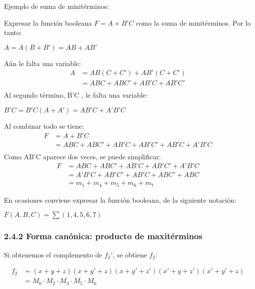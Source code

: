 \documentclass{article}
\begin{document}
Ejemplo de suma de minit\'{e}rminos:
\begin{flushleft}
    Expresar la funci\'{o}n booleana $F = A + B'C$ como la suma de minit\'{e}rminos. Por lo tanto:
    \begin{center}
        $A = A(B + B') = AB + AB'$
    \end{center}
    A\'{u}n le falta una variable:
    \begin{align*}
        A &= AB(C + C') + AB'(C + C') \\
        &= ABC + ABC' + AB'C + AB'C' \\
    \end{align*}
    Al segundo t\'{e}rmino, B'C , le falta una variable:
    \begin{center}
        $B'C = B'C(A + A') = AB'C + A'B'C$
    \end{center}
    Al combinar todo se tiene:
    \begin{align*}
        F &= A + B'C \\
        &= ABC + ABC' + AB'C + AB'C' + AB'C + A'B'C \\
    \end{align*}
    Como AB'C aparece dos veces, se puede simplificar:
    \begin{align*}
        F &= ABC + ABC' + AB'C + AB'C' + A'B'C \\
        &= A'B'C + AB'C' + AB'C + ABC' + ABC \\ 
        &= m_1 + m_4 + m_5 + m_6 + m_7
    \end{align*}
\end{flushleft}

En ocasiones conviene expresar la funci\'{o}n booleana, de la siguiente notaci\'{o}n:
\begin{center}
    $F(A, B, C) = \sum(1, 4, 5, 6, 7)$
\end{center}

\subsubsection*{2.4.2 Forma can\'{o}nica: producto de maxit\'{e}rminos}
\begin{flushleft}
    Si obtenemos el complemento de $f_2'$, se obtiene $f_2$:
\end{flushleft}
\begin{align*}
    f_2 &= (x + y + z)(x + y' + z)(x + y' + z')(x' + y + z')(x' + y' + z) \\
    &= M_0 \cdot M_2 \cdot M_3 \cdot M_5 \cdot M_6
\end{align*}
\end{document}
